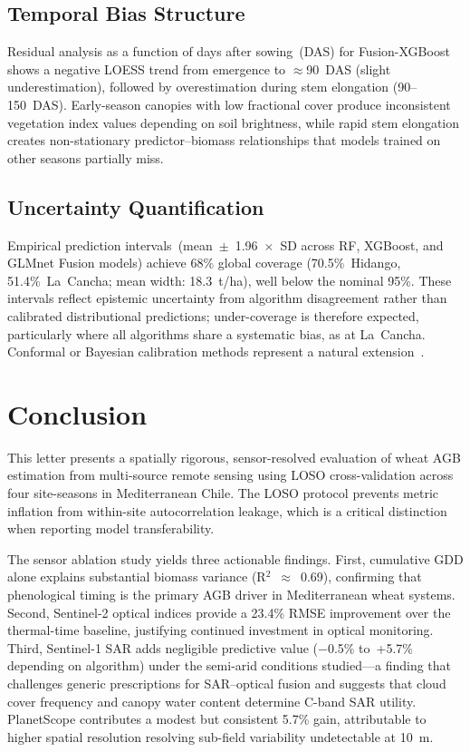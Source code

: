 \documentclass[lettersize,journal]{IEEEtran}
\begin{document}
\subsection{Temporal Bias Structure}

Residual analysis as a function of days after sowing~(DAS) for
Fusion-XGBoost shows a negative LOESS trend from emergence to $\approx$90~DAS
(slight underestimation), followed by overestimation during stem elongation
(90--150~DAS). Early-season canopies with low fractional cover produce
inconsistent vegetation index values depending on soil brightness, while rapid
stem elongation creates non-stationary predictor--biomass relationships that
models trained on other seasons partially miss.

\subsection{Uncertainty Quantification}

Empirical prediction intervals~(mean~$\pm$~1.96~$\times$~SD across RF,
XGBoost, and GLMnet Fusion models) achieve 68\% global coverage
(70.5\%~Hidango, 51.4\%~La~Cancha; mean width: 18.3~t/ha), well below the
nominal 95\%. These intervals reflect epistemic uncertainty from algorithm
disagreement rather than calibrated distributional predictions; under-coverage
is therefore expected, particularly where all algorithms share a systematic
bias, as at La~Cancha. Conformal or Bayesian calibration methods represent a
natural extension~\cite{ref17}.

\section{Conclusion}

This letter presents a spatially rigorous, sensor-resolved evaluation of wheat
AGB estimation from multi-source remote sensing using LOSO cross-validation
across four site-seasons in Mediterranean Chile. The LOSO protocol prevents
metric inflation from within-site autocorrelation leakage, which is a critical
distinction when reporting model transferability.

The sensor ablation study yields three actionable findings. First, cumulative
GDD alone explains substantial biomass variance (R$^2$~$\approx$~0.69),
confirming that phenological timing is the primary AGB driver in Mediterranean
wheat systems. Second, Sentinel-2 optical indices provide a 23.4\% RMSE
improvement over the thermal-time baseline, justifying continued investment in
optical monitoring. Third, Sentinel-1 SAR adds negligible predictive value
($-$0.5\% to~+5.7\% depending on algorithm) under the semi-arid conditions
studied---a finding that challenges generic prescriptions for SAR--optical
fusion and suggests that cloud cover frequency and canopy water content
determine C-band SAR utility. PlanetScope contributes a modest but consistent
5.7\% gain, attributable to higher spatial resolution resolving sub-field
variability undetectable at 10~m.
\end{document}
